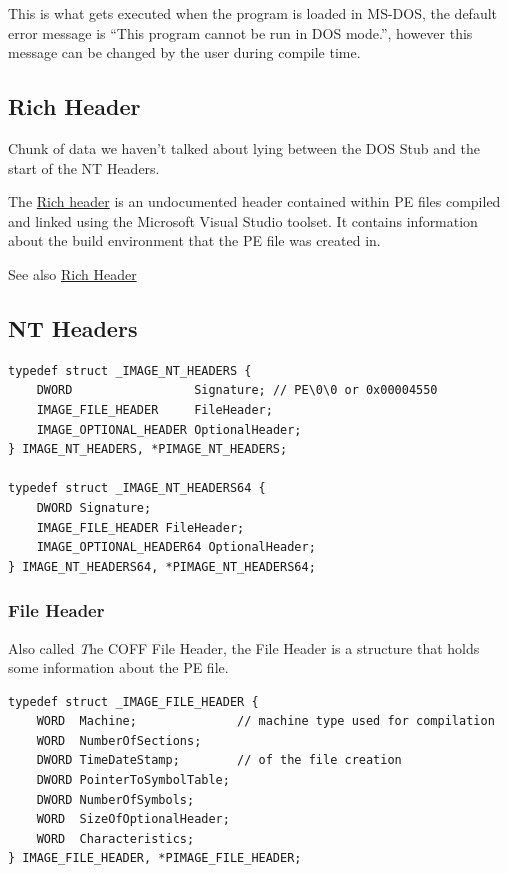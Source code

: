 This is what gets executed when the program is loaded in MS-DOS, the default error message is “This program cannot be run in DOS mode.”, however this message can be changed by the user during compile time.



\subsection{Rich Header}

Chunk of data we haven’t talked about lying between the DOS Stub and the start of the NT Headers.

The \href{https://github.com/RichHeaderResearch/RichPE}{Rich header} is an undocumented header contained within PE files compiled and linked using the Microsoft Visual Studio toolset. It contains information about the build environment that the PE file was created in.

See also \href{https://0xrick.github.io/win-internals/pe3/#rich-header}{Rich Header}

\subsection{NT Headers}

\begin{verbatim}
typedef struct _IMAGE_NT_HEADERS {
    DWORD                 Signature; // PE\0\0 or 0x00004550
    IMAGE_FILE_HEADER     FileHeader;
    IMAGE_OPTIONAL_HEADER OptionalHeader;
} IMAGE_NT_HEADERS, *PIMAGE_NT_HEADERS;

typedef struct _IMAGE_NT_HEADERS64 {
    DWORD Signature;
    IMAGE_FILE_HEADER FileHeader;
    IMAGE_OPTIONAL_HEADER64 OptionalHeader;
} IMAGE_NT_HEADERS64, *PIMAGE_NT_HEADERS64;
\end{verbatim}

\subsubsection{File Header}
Also called {\emph The COFF File Header}, the File Header is a structure that holds some information about the PE file.
\begin{verbatim}
typedef struct _IMAGE_FILE_HEADER {
    WORD  Machine;              // machine type used for compilation
    WORD  NumberOfSections; 
    DWORD TimeDateStamp;        // of the file creation  
    DWORD PointerToSymbolTable;
    DWORD NumberOfSymbols;
    WORD  SizeOfOptionalHeader;
    WORD  Characteristics;
} IMAGE_FILE_HEADER, *PIMAGE_FILE_HEADER;
\end{verbatim}

